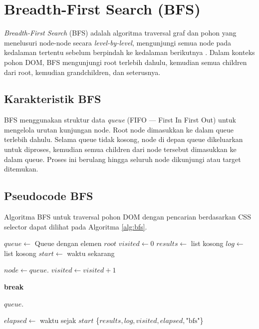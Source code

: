 \section{Breadth-First Search (BFS)}

\textit{Breadth-First Search} (BFS) adalah algoritma traversal graf dan pohon
yang menelusuri node-node secara \textit{level-by-level}, mengunjungi semua node
pada kedalaman tertentu sebelum berpindah ke kedalaman berikutnya
\cite{cormen2009introduction}. Dalam konteks pohon DOM, BFS mengunjungi root
terlebih dahulu, kemudian semua children dari root, kemudian grandchildren, dan
seterusnya.

\subsection{Karakteristik BFS}

BFS menggunakan struktur data \textit{queue} (FIFO --- First In First Out) untuk
mengelola urutan kunjungan node. Root node dimasukkan ke dalam queue terlebih
dahulu. Selama queue tidak kosong, node di depan queue dikeluarkan untuk
diproses, kemudian semua children dari node tersebut dimasukkan ke dalam queue.
Proses ini berulang hingga seluruh node dikunjungi atau target ditemukan.

\subsection{Pseudocode BFS}

Algoritma BFS untuk traversal pohon DOM dengan pencarian berdasarkan CSS selector
dapat dilihat pada Algoritma \ref{alg:bfs}.

\begin{algorithm}
\caption{BFS untuk Penelusuran Pohon DOM}
\label{alg:bfs}
\begin{algorithmic}[1]
    \State $queue \gets$ Queue dengan elemen $root$
    \State $visited \gets 0$
    \State $results \gets$ list kosong
    \State $log \gets$ list kosong
    \State $start \gets$ waktu sekarang
    
        \State $node \gets queue.$
        \State $visited \gets visited + 1$
        
            \State {}
            \State {}
                \State \textbf{break}
            \EndIf
        \Else
            \State {}
        \EndIf
        
            \State $queue.$
        \EndFor
    \EndWhile
    
    \State $elapsed \gets$ waktu sejak $start$
    \State \Return \{$results, log, visited, elapsed, \text{"bfs"}$\}
\EndFunction
\end{algorithmic}
\end{algorithm}

